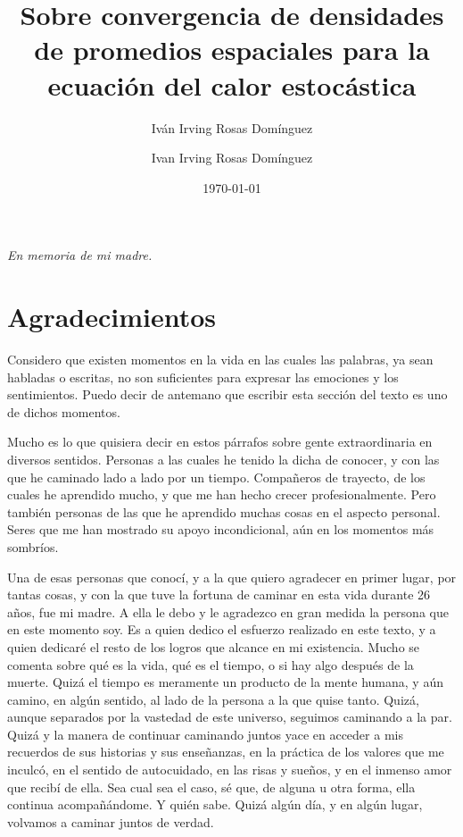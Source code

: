 \documentclass[letterpaper,twoside,12pt]{book}
\title{\textbf{}}
\author{Iván Irving Rosas Domínguez}
\date{\today}
\author{Ivan Irving Rosas Domínguez}
\title{Sobre convergencia de densidades de promedios espaciales para la ecuación del calor estocástica}
\newcommand{\1}{\mathds{1}}
\theoremstyle{definition}
\theoremstyle{definition}
\theoremstyle{remark}
\theoremstyle{definition}
\theoremstyle{definition}
\theoremstyle{definition}
\theoremstyle{definition}
\theoremstyle{definition}
\begin{document}
\maketitle 
\thispagestyle{empty}  
\frontmatter

\chapter*{}
\begin{flushright}%
 \emph{En memoria de mi madre.}
  \thispagestyle{empty}
\end{flushright}

\chapter*{Agradecimientos}

Considero que existen momentos en la vida en las cuales las palabras, ya sean habladas o escritas, no son suficientes para expresar las emociones y los sentimientos. Puedo decir de antemano que escribir esta sección del texto es uno de dichos momentos.

Mucho es lo que quisiera decir en estos párrafos sobre gente extraordinaria en diversos sentidos. Personas a las cuales he tenido la dicha de conocer, y con las que he caminado lado a lado por un tiempo. Compañeros de trayecto, de los cuales he aprendido mucho, y que me han hecho crecer profesionalmente. Pero también personas de las que he aprendido muchas cosas en el aspecto personal. Seres que me han mostrado su apoyo incondicional, aún en los momentos más sombríos.

Una de esas personas que conocí, y a la que quiero agradecer en primer lugar, por tantas cosas, y con la que tuve la fortuna de caminar en esta vida durante 26 años, fue mi madre. A ella le debo y le agradezco en gran medida la persona que en este momento soy. Es a quien dedico el esfuerzo realizado en este texto, y a quien dedicaré el resto de los logros que alcance en mi existencia. Mucho se comenta sobre qué es la vida, qué es el tiempo, o si hay algo después de la muerte. Quizá el tiempo es meramente un producto de la mente humana, y aún camino, en algún sentido, al lado de la persona a la que quise tanto. Quizá, aunque separados por la vastedad de este universo, seguimos caminando a la par. Quizá y la manera de continuar caminando juntos yace en acceder a mis recuerdos de sus historias y sus enseñanzas, en la práctica de los valores que me inculcó, en el sentido de autocuidado, en las risas y sueños, y en el inmenso amor que recibí de ella. Sea cual sea el caso, sé que, de alguna u otra forma, ella continua acompañándome. Y quién sabe. Quizá algún día, y en algún lugar, volvamos a caminar juntos de verdad.
\end{document}
